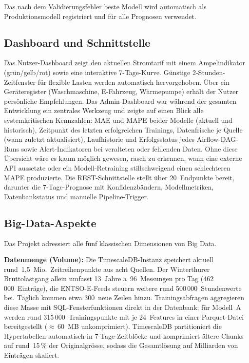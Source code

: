 \documentclass[sigconf]{acmart}
\begin{document}
Das nach dem Validierungsfehler beste Modell wird automatisch als
Produktionsmodell registriert und f\"ur alle Prognosen verwendet.

\subsection{Dashboard und Schnittstelle}

Das Nutzer-Dashboard zeigt den aktuellen Stromtarif mit einem Ampelindikator
(gr\"un/gelb/rot) sowie eine interaktive 7-Tage-Kurve.
G\"unstige 2-Stunden-Zeitfenster f\"ur flexible Lasten werden automatisch
hervorgehoben.
\"Uber ein Ger\"ateregister (Waschmaschine, E-Fahrzeug, W\"armepumpe) erh\"alt
der Nutzer pers\"onliche Empfehlungen.
Das Admin-Dashboard war w\"ahrend der gesamten Entwicklung ein zentrales
Werkzeug und zeigte auf einen Blick alle systemkritischen Kennzahlen:
MAE und MAPE beider Modelle (aktuell und historisch), Zeitpunkt des letzten
erfolgreichen Trainings, Daten\-frische je Quelle (wann zuletzt aktualisiert),
Laufhistorie und Erfolgs\-status jedes Airflow-DAG-Runs sowie Alert-Indikatoren
bei veralteten oder fehlenden Daten.
Ohne diese \"Ubersicht w\"are es kaum m\"oglich gewesen, rasch zu erkennen,
wann eine externe API aussetzte oder ein Modell-Retraining still\-schweigend
einen schlechteren MAPE produzierte.
Die REST-Schnittstelle stellt \"uber 20~Endpunkte bereit, darunter die
7-Tage-Prognose mit Konfidenzb\"andern, Modell\-metriken, Datenbankstatus
und manuelle Pipeline-Trigger.

\subsection{Big-Data-Aspekte}

Das Projekt adressiert alle f\"unf klassischen Dimensionen von Big Data.

\textbf{Datenmenge (Volume):}
Die TimescaleDB-Instanz speichert aktuell rund~1{,}5~Mio.\
Zeitreihenpunkte aus acht Quellen.
Der Winterthurer Bruttolastgang allein umfasst 13~Jahre a~96~Messungen
pro Tag (462\,000~Eintr\"age), die ENTSO-E-Feeds steuern weitere rund
500\,000~Stundenwerte bei.
T\"aglich kommen etwa 300~neue Zeilen hinzu.
Trainingsabfragen aggregieren diese Masse mit SQL-Fensterfunktionen
direkt in der Datenbank; f\"ur Modell~A werden rund 315\,000~Trainings\-punkte
mit je 24~Features in einer Parquet-Datei bereitgestellt
($\approx$\,60~MB unkomprimiert).
TimescaleDB partitioniert die Hypertabellen automatisch in
7-Tage-Zeitbl\"ocke und komprimiert \"altere Chunks auf rund~15\,\%
der Originalgr\"osse, sodass die Gesamtl\"osung auf Milliarden
von Eintr\"agen skaliert.
\end{document}
